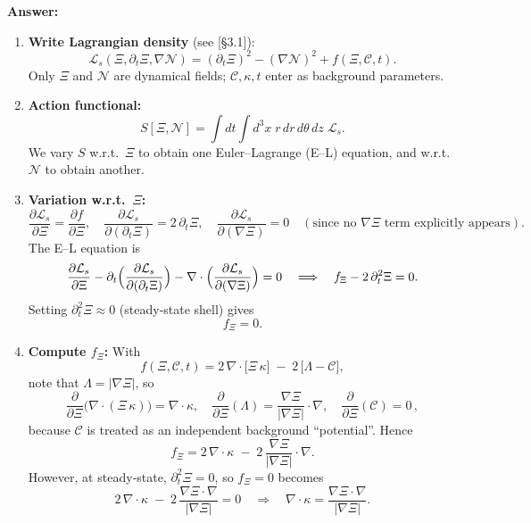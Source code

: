 \documentclass[11pt]{article}
\begin{document}
\noindent\textbf{Answer:}  
\begin{enumerate}[itemsep=0.5em]
  \item \textbf{Write Lagrangian density} (see [§3.1]): 
    \[
      \mathcal L_s(\Xi,\partial_t\Xi,\nabla \mathcal N) 
      = (\partial_t \Xi)^2 - (\nabla \mathcal N)^2 + f(\Xi,\mathcal C,t).
    \]
    Only $\Xi$ and $\mathcal N$ are dynamical fields; $\mathcal C,\kappa,t$ enter as background parameters.  
  \item \textbf{Action functional:} 
    \[
      S[\Xi,\mathcal N] 
      = \int dt \int d^3x \; r\,dr\,d\theta\,dz \;\mathcal L_s.
    \]
    We vary $S$ w.r.t.\ $\Xi$ to obtain one Euler–Lagrange (E–L) equation, and w.r.t.\ $\mathcal N$ to obtain another.  
  \item \textbf{Variation w.r.t.\ $\Xi$:}  
    \[
      \frac{\partial\mathcal L_s}{\partial\Xi} 
      = \frac{\partial f}{\partial\Xi},
      \quad
      \frac{\partial\mathcal L_s}{\partial(\partial_t\Xi)} 
      = 2\,\partial_t \Xi,
      \quad
      \frac{\partial\mathcal L_s}{\partial(\nabla\Xi)} 
      = 0 \quad(\text{since no $\nabla\Xi$ term explicitly appears}).
    \]
    The E–L equation is
    \[
      \frac{\partial\mathcal L_s}{\partial\Xi} 
      - \partial_t\Bigl(\frac{\partial\mathcal L_s}{\partial(\partial_t\Xi)}\Bigr)
      - \nabla\cdot\Bigl(\frac{\partial\mathcal L_s}{\partial(\nabla\Xi)}\Bigr)
      = 0
      \quad\Longrightarrow\quad
      f_\Xi - 2\,\partial_t^2 \Xi = 0.
    \]
    Setting $\partial_t^2\Xi \approx 0$ (steady‐state shell) gives
    \[
      f_\Xi = 0.
    \]
  \item \textbf{Compute $f_\Xi$:}  
    With
    \[
      f(\Xi,\mathcal C,t) 
      = 2\,\nabla\!\cdot\bigl[\Xi\,\kappa\bigr] \;-\; 2\,\bigl[\Lambda - \mathcal C\bigr],
    \]
    note that $\Lambda = |\nabla \Xi|$, so 
    \[
      \frac{\partial}{\partial\Xi}\bigl(\nabla\!\cdot(\Xi\,\kappa)\bigr) 
      = \nabla\!\cdot\kappa,
      \quad
      \frac{\partial}{\partial\Xi}(\Lambda) 
      = \frac{\nabla\Xi}{|\nabla\Xi|}\cdot\nabla,
      \quad
      \frac{\partial}{\partial\Xi}(\mathcal C) = 0\,,
    \]
    because $\mathcal C$ is treated as an independent background “potential”.  Hence
    \[
      f_\Xi 
      = 2\,\nabla\!\cdot\kappa \;-\; 2\,\frac{\nabla\Xi}{|\nabla\Xi|}\cdot\nabla.
    \]
    However, at steady‐state, $\partial_t^2\Xi=0$, so $f_\Xi=0$ becomes
    \[
      2\,\nabla\!\cdot\kappa \;-\; 2\,\frac{\nabla\Xi\cdot\nabla}{|\nabla\Xi|} = 0
      \quad\Longrightarrow\quad
      \nabla\!\cdot\kappa = \frac{\nabla\Xi\cdot\nabla}{|\nabla\Xi|}.
\]
\end{enumerate}
\end{document}

